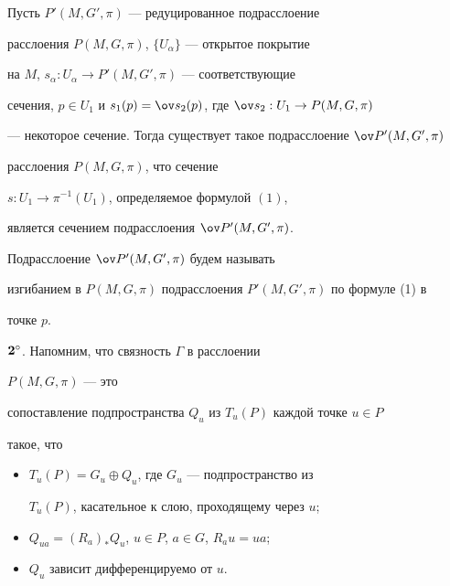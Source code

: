  


\begin{thm} 


Пусть $P'(M,G',\pi)$ --- редуцированное подрасслоение 


расслоения $P(M,G,\pi)$, $\{U_\alpha\}$ --- открытое покрытие 


на $M$, $s_\alpha:U_\alpha\to P'(M,G',\pi)$ --- соответствующие 


сечения, $p\in U_1$ и $s_1(p)=\ov s_2(p)$, где $\ov s_2:U_1\to P(M,G,\pi)$ 


--- некоторое сечение. Тогда существует такое подрасслоение $\ov 


P{}'(M,G',\pi)$ 


расслоения $P(M,G,\pi)$, что сечение


$s:U_1\to\pi^{-1}(U_1)$, определяемое формулой $(1)$,


является сечением подрасслоения $\ov P{}'(M,G',\pi)$. 


\end{thm} 


 


\begin{defn} 


Подрасслоение $\ov P{}'(M,G',\pi)$ будем называть 


изгибанием в $P(M,G,\pi)$ подрасслоения $P'(M,G',\pi)$ по формуле (1) в 


точке $p$. 


\end{defn} 


 


$\bold 2^\circ$. Напомним, что связность $\Gamma$ в расслоении 


$P(M,G,\pi)$ --- это 


сопоставление подпространства $Q_u$ из $T_u(P)$ каждой точке $u\in P$ 


такое, что 


\begin{itemize} 


\item[(a)] $T_u(P)=G_u\oplus Q_u$, где $G_u$ --- подпространство из 


$T_u(P)$, касательное к слою, проходящему через $u$;


\item[(b)] $Q_{u a}=(R_a)_*Q_u$, $u\in P$, $a\in G$, $R_a u=u a$;


\item[(c)] $Q_u$ зависит дифференцируемо от $u$. 


\end{itemize} 


